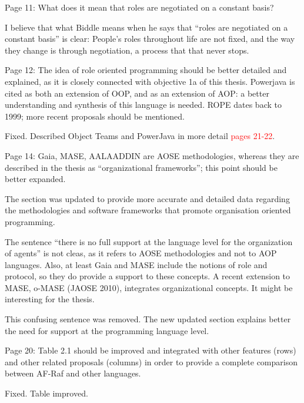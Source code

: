 \documentclass{article}
\newcommand*\R[1]{\textcolor{red}{#1}} %
\newenvironment{them}{\noindent\begingroup\color{blue}}{\endgroup\par}
\begin{document}
\begin{them}

Page 11:
What does it mean that roles are negotiated on a constant basis?
\end{them}

I believe that what Biddle means when he says that ``roles are negotiated on
a constant basis'' is clear: People's roles throughout life are not fixed,
and the way they change is through negotiation, a process that that never
stops.


\begin{them}

Page 12:
The idea of role oriented programming should be better detailed and explained,
as it is closely connected with objective 1a of this thesis. Powerjava is cited
as both an extension of OOP, and as an extension of AOP: a better understanding
and synthesis of this language is needed. ROPE dates back to 1999; more recent
proposals should be mentioned.

\end{them}
Fixed. Described Object Teams and PowerJava in more detail \R{pages 21-22}.

\begin{them}

Page 14:
Gaia, MASE, AALAADDIN are AOSE methodologies, whereas they are described in the
thesis as ``organizational frameworks''; this point should be better expanded.

\end{them}
The section was updated to provide more accurate and detailed data regarding
the methodologies and software frameworks that promote organisation oriented
programming.

\begin{them}

The sentence ``there is no full support at the language level for the
organization of agents'' is not cleas, as it refers to AOSE methodologies and
not to AOP languages. Also, at least Gaia and MASE include the notions of role
and protocol, so they do provide a support to these concepts. A recent
extension to MASE, o-MASE (JAOSE 2010), integrates organizational concepts. It
might be interesting for the thesis.

\end{them}
This confusing sentence was removed. The new updated section explains better
the need for support at the programming language level. 

\begin{them}

Page 20:
Table 2.1 should be improved and integrated with other features (rows) and
other related proposals (columns) in order to provide a complete comparison
between AF-Raf and other languages.

\end{them}
Fixed. Table improved.
\end{document}
